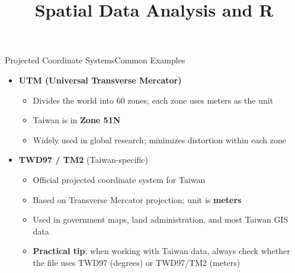 \documentclass[hyperref={pdfpagelabels=false}]{beamer}
\begin{document}
 
 
 
\begin{frame}{Projected Coordinate Systems}{Common Examples}
\begin{itemize}
	\item \textbf{UTM (Universal Transverse Mercator)}
	\vspace{0.1cm}
	\begin{itemize}
		\item Divides the world into 60 zones; each zone uses meters as the unit
		\vspace{0.1cm}
		\item Taiwan is in \textbf{Zone 51N}
		\vspace{0.1cm}
		\item Widely used in global research; minimizes distortion within each zone
	\end{itemize}
	\vspace{0.3cm}
	\item \textbf{TWD97 / TM2} (Taiwan-specific)
	\vspace{0.1cm}
	\begin{itemize}
		\item Official projected coordinate system for Taiwan
		\vspace{0.1cm}
		\item Based on Transverse Mercator projection; unit is \textbf{meters}
		\vspace{0.1cm}
		\item Used in government maps, land administration, and most Taiwan GIS data
		\vspace{0.1cm}
		\item \textbf{Practical tip}: when working with Taiwan data, always check whether the file uses TWD97 (degrees) or TWD97/TM2 (meters)
	\end{itemize}
 
\end{itemize}
\end{frame}
 
 
 



\title[]  
{Spatial Data Analysis and R}


\author 
{}

\institute{}

\end{document}
